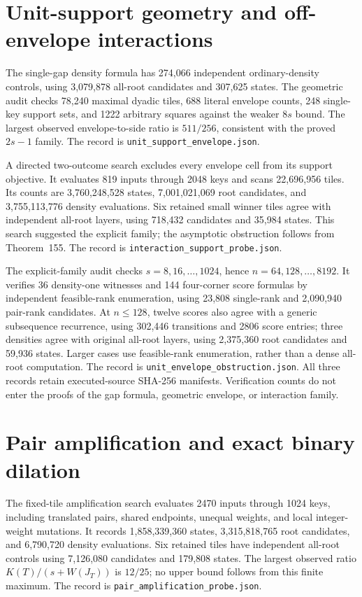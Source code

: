 \documentclass[11pt]{article}
\begin{document}
\section{Unit-support geometry and off-envelope interactions}
\label{app:unit-support-envelope}
The single-gap density formula has 274,066 independent ordinary-density
controls, using 3,079,878 all-root candidates and 307,625 states. The
geometric audit checks 78,240 maximal dyadic tiles, 688 literal envelope
counts, 248 single-key support sets, and 1222 arbitrary squares against
the weaker $8s$ bound. The largest observed envelope-to-side ratio is
$511/256$, consistent with the proved $2s-1$ family. The record is
\texttt{unit\_support\_envelope.json}.

A directed two-outcome search excludes every envelope cell from its
support objective. It evaluates 819 inputs through 2048 keys and scans
22,696,956 tiles. Its counts are 3,760,248,528 states, 7,001,021,069 root
candidates, and 3,755,113,776 density evaluations. Six retained small
winner tiles agree with independent all-root layers, using 718,432
candidates and 35,984 states. This search suggested the explicit family;
the asymptotic obstruction follows from
Theorem~155. The record is
\texttt{interaction\_support\_probe.json}.

The explicit-family audit checks $s=8,16,\ldots,1024$, hence
$n=64,128,\ldots,8192$. It verifies 36 density-one witnesses and 144
four-corner score formulas by independent feasible-rank enumeration,
using 23,808 single-rank and 2,090,940 pair-rank candidates.
At $n\le128$, twelve scores also agree with a generic subsequence
recurrence, using 302,446 transitions and 2806 score entries; three
densities agree with original all-root layers, using 2,375,360 root
candidates and 59,936 states. Larger cases use feasible-rank enumeration,
rather than a dense all-root computation. The record is
\texttt{unit\_envelope\_obstruction.json}. All three records retain
executed-source SHA-256 manifests. Verification counts do not enter
the proofs of the gap formula, geometric envelope, or interaction family.

\section{Pair amplification and exact binary dilation}
\label{app:binary-dilation}
The fixed-tile amplification search evaluates 2470 inputs through 1024
keys, including translated pairs, shared endpoints, unequal weights,
and local integer-weight mutations. It records 1,858,339,360 states,
3,315,818,765 root candidates, and 6,790,720 density evaluations.
Six retained tiles have independent all-root controls using 7,126,080
candidates and 179,808 states. The largest observed ratio
$K(T)/(s+W(J_T))$ is $12/25$; no upper bound follows from this finite
maximum. The record is \texttt{pair\_amplification\_probe.json}.
\end{document}
